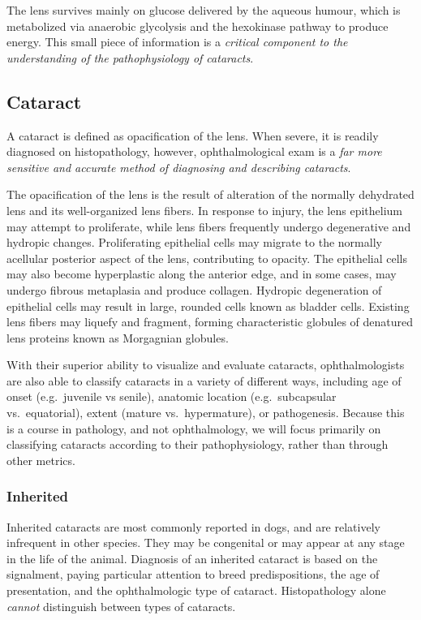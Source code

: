 \documentclass[
  openany]{article}
\begin{document}
The lens survives mainly on glucose delivered by the aqueous humour, which is metabolized via anaerobic glycolysis and the hexokinase pathway to produce energy. This small piece of information is a \emph{critical component to the understanding of the pathophysiology of cataracts}.

\hypertarget{cataract}{%
\subsection{Cataract}\label{cataract}}

A cataract is defined as opacification of the lens. When severe, it is readily diagnosed on histopathology, however, ophthalmological exam is a \emph{far more sensitive and accurate method of diagnosing and describing cataracts}.

The opacification of the lens is the result of alteration of the normally dehydrated lens and its well-organized lens fibers. In response to injury, the lens epithelium may attempt to proliferate, while lens fibers frequently undergo degenerative and hydropic changes. Proliferating epithelial cells may migrate to the normally acellular posterior aspect of the lens, contributing to opacity. The epithelial cells may also become hyperplastic along the anterior edge, and in some cases, may undergo fibrous metaplasia and produce collagen. Hydropic degeneration of epithelial cells may result in large, rounded cells known as bladder cells. Existing lens fibers may liquefy and fragment, forming characteristic globules of denatured lens proteins known as Morgagnian globules.

With their superior ability to visualize and evaluate cataracts, ophthalmologists are also able to classify cataracts in a variety of different ways, including age of onset (e.g.~juvenile vs senile), anatomic location (e.g.~subcapsular vs.~equatorial), extent (mature vs.~hypermature), or pathogenesis. Because this is a course in pathology, and not ophthalmology, we will focus primarily on classifying cataracts according to their pathophysiology, rather than through other metrics.

\hypertarget{inherited}{%
\subsubsection{Inherited}\label{inherited}}

Inherited cataracts are most commonly reported in dogs, and are relatively infrequent in other species. They may be congenital or may appear at any stage in the life of the animal. Diagnosis of an inherited cataract is based on the signalment, paying particular attention to breed predispositions, the age of presentation, and the ophthalmologic type of cataract. Histopathology alone \emph{cannot} distinguish between types of cataracts.
\end{document}
